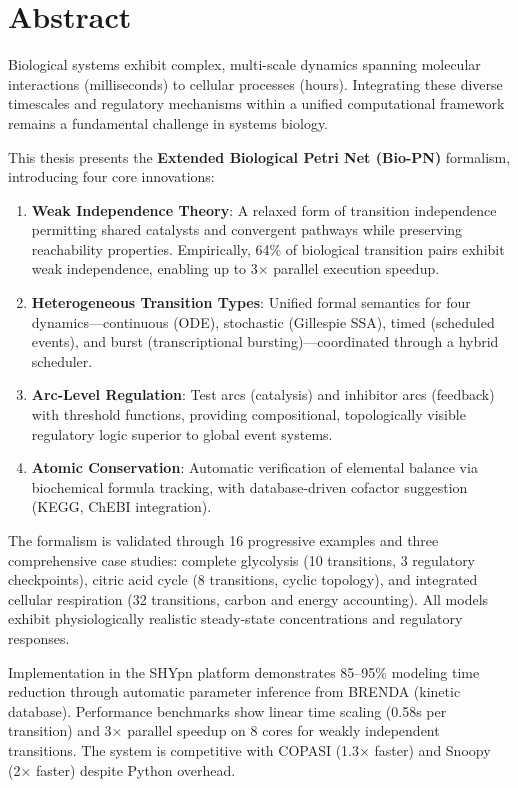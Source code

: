 \chapter*{Abstract}

Biological systems exhibit complex, multi-scale dynamics spanning molecular interactions (milliseconds) to cellular processes (hours). Integrating these diverse timescales and regulatory mechanisms within a unified computational framework remains a fundamental challenge in systems biology.

This thesis presents the \textbf{Extended Biological Petri Net (Bio-PN)} formalism, introducing four core innovations:

\begin{enumerate}
    \item \textbf{Weak Independence Theory}: A relaxed form of transition independence permitting shared catalysts and convergent pathways while preserving reachability properties. Empirically, 64\% of biological transition pairs exhibit weak independence, enabling up to 3× parallel execution speedup.
    
    \item \textbf{Heterogeneous Transition Types}: Unified formal semantics for four dynamics---continuous (ODE), stochastic (Gillespie SSA), timed (scheduled events), and burst (transcriptional bursting)---coordinated through a hybrid scheduler.
    
    \item \textbf{Arc-Level Regulation}: Test arcs (catalysis) and inhibitor arcs (feedback) with threshold functions, providing compositional, topologically visible regulatory logic superior to global event systems.
    
    \item \textbf{Atomic Conservation}: Automatic verification of elemental balance via biochemical formula tracking, with database-driven cofactor suggestion (KEGG, ChEBI integration).
\end{enumerate}

The formalism is validated through 16 progressive examples and three comprehensive case studies: complete glycolysis (10 transitions, 3 regulatory checkpoints), citric acid cycle (8 transitions, cyclic topology), and integrated cellular respiration (32 transitions, carbon and energy accounting). All models exhibit physiologically realistic steady-state concentrations and regulatory responses.

Implementation in the SHYpn platform demonstrates 85--95\% modeling time reduction through automatic parameter inference from BRENDA (kinetic database). Performance benchmarks show linear time scaling (0.58s per transition) and 3× parallel speedup on 8 cores for weakly independent transitions. The system is competitive with COPASI (1.3× faster) and Snoopy (2× faster) despite Python overhead.

